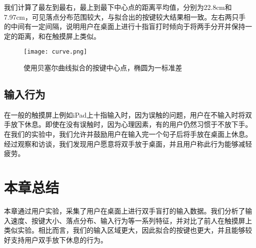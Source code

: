 我们计算了最左到最右，最上到最下中心点的距离平均值，分别为22.8cm和7.97cm，可见落点分布范围较大，与拟合出的按键较大结果相一致。左右两只手的中间有一定间隔，说明用户在桌面上进行十指盲打时倾向于将两手分开并保持一定的距离，和在触摸屏上类似\cite{flatglass2011findlater}。
\begin{figure}[ht]
  \centering
  \texttt{[image: curve.png]}
  \caption{使用贝塞尔曲线拟合的按键中心点，椭圆为一标准差}
  \label{fig:keyboard-curve}
\end{figure}

\subsection{输入行为}
在一般的触摸屏上例如iPad上十指输入时，因为误触的问题，用户在不输入时将双手放下休息。即使在没有误触时，因为心理因素，有的用户仍然习惯于不放下手\cite{palmboard2020}。在我们的实验中，我们允许并鼓励用户在输入完一个句子后将手放在桌面上休息。经过观察和访谈，我们发现用户愿意将双手放于桌面，并且用户称此行为能够减轻疲劳。

\section{本章总结}
本章通过用户实验，采集了用户在桌面上进行双手盲打的输入数据。我们分析了输入速度、按键大小、落点分布、输入行为等一系列特征，并对比了前人在触摸屏上类似实验。相比而言，我们的输入区域更大，因此拟合的按键也更大，并且能够较好支持用户双手放下休息的行为。